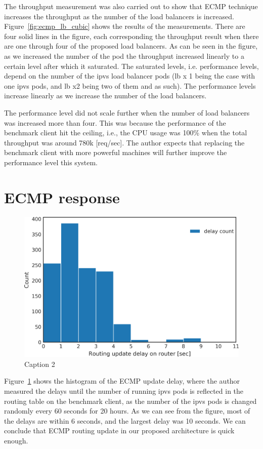 The throughput measurement was also carried out to show that ECMP technique increases the throughput as the number of the load balancers is increased.
Figure~\ref{fig:ecmp_lb_cubic} shows the results of the measurements.
There are four solid lines in the figure, each corresponding the throughput result when there are one through four of the proposed load balancers.
As can be seen in the figure, as we increased the number of the pod the throughput increased linearly to a certain level after which it saturated.
The saturated levels, i.e. performance levels, depend on the number of the ipvs load balancer pods (lb x 1 being the case with one ipvs pods, and lb x2 being two of them and as such).
The performance levels increase linearly as we increase the number of the load balancers.

The performance level did not scale further when the number of load balancers was increased more than four.
This was because the performance of the benchmark client hit the ceiling, i.e., the CPU usage was 100\% when the total throughput was around 780k [req/sec].
The author expects that replacing the benchmark client with more powerful machines will further improve the performance level this system.

\FloatBarrier

\section{ECMP response}

\begin{figure}[t]
  \includegraphics[width=0.9\columnwidth,left]{Figs/ecmp_delay_histgram}
  \caption{Caption 2}
  \label{fig:ecmp_delay_histgram}
\end{figure}

Figure~\ref{fig:ecmp_delay_histgram} shows the histogram of the ECMP update delay, where the author measured the delays until the number of running ipvs pods is reflected in the routing table on the benchmark client, as the number of the ipvs pods is changed randomly every 60 seconds for 20 hours.
As we can see from the figure, most of the delays are within 6 seconds, and the largest delay was 10 seconds.
We can conclude that ECMP routing update in our proposed architecture is quick enough.

